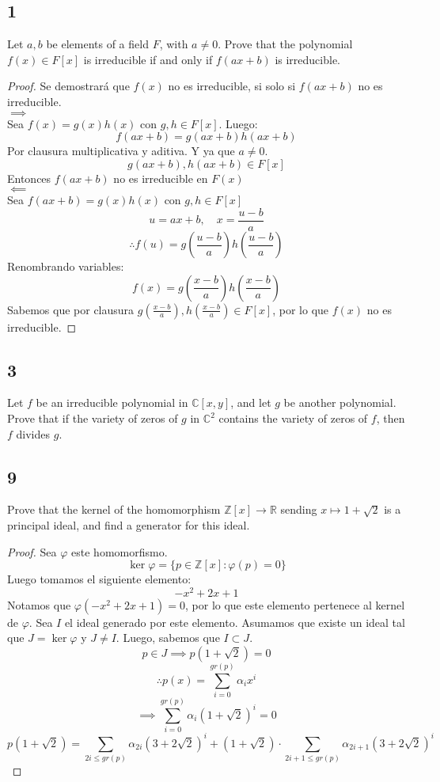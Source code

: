 \documentclass[11pt]{article}
\newcommand{\set}[1]{\mathbb{#1}}
\theoremstyle{definition}
\begin{document}
    \subsection{1}
    Let $a,b$ be elements of a field $F$, with $a \neq 0$. Prove that the polynomial $f(x)\in F[x]$ is irreducible if and only if $f(ax+b)$ is irreducible.
    \begin{proof}
        Se demostrará que $f(x)$ no es irreducible, si solo si $f(ax+b)$ no es irreducible.\\
        $\implies$\\
        Sea $f(x)=g(x)h(x)$ con $g,h\in F[x]$. Luego:
        \[f(ax+b)=g(ax+b)h(ax+b)\]
        Por clausura multiplicativa y aditiva. Y ya que $a\neq 0$.
        \[g(ax+b),h(ax+b)\in F[x]\]
        Entonces $f(ax+b)$ no es irreducible en $F(x)$\\
        $\impliedby$\\
        Sea $f(ax+b)=g(x)h(x)$ con $g,h\in F[x]$
        \[u=ax+b,\quad x=\frac{u-b}{a}\]
        \[\therefore f(u)=g\left(\frac{u-b}{a}\right)h\left(\frac{u-b}{a}\right)\]
        Renombrando variables:
        \[f(x)=g\left(\frac{x-b}{a}\right)h\left(\frac{x-b}{a}\right)\]
        Sabemos que por clausura $g\left(\frac{x-b}{a}\right),h\left(\frac{x-b}{a}\right)\in F[x]$, por lo que $f(x)$ no es irreducible.
    \end{proof}
    \subsection{3}
    Let $f$ be an irreducible polynomial in $\set{C}[x,y]$, and let $g$ be another polynomial. Prove that if the variety of zeros of $g$ in $\set{C}^2$ contains the variety of zeros of $f$, then $f$ divides $g$.
    \[\]

    \subsection{9}
    Prove that the kernel of the homomorphism $\set{Z}[x]\rightarrow \set{R}$ sending $x\mapsto 1+\sqrt{2}$ is a principal ideal, and find a generator for this ideal.
    \begin{proof}
        Sea $\varphi$ este homomorfismo.
        \[\ker\varphi=\{p\in\set{Z}[x]:\varphi(p)=0\}\]
        Luego tomamos el siguiente elemento:
        \[-x^2+2x+1\]
        Notamos que $\varphi(-x^2+2x+1)=0$, por lo que este elemento pertenece al kernel de $\varphi$. Sea $I$ el ideal generado por este elemento. Asumamos que existe un ideal tal que $J=\ker\varphi$ y $J\neq I$. Luego, sabemos que $I\subset J$.
        \[p\in J\implies p(1+\sqrt{2})=0\]
        \[\therefore p(x)=\sum^{gr(p)}_{i=0}\alpha_ix^i\]
        \[\implies\sum^{gr(p)}_{i=0}\alpha_i(1+\sqrt{2})^i=0\]
        \[p(1+\sqrt{2})=\sum_{2i\leq gr(p)}\alpha_{2i}(3+2\sqrt{2})^i+(1+\sqrt{2})\cdot\sum_{2i+1\leq gr(p)}\alpha_{2i+1}(3+2\sqrt{2})^i\]
    \end{proof}
\end{document}

